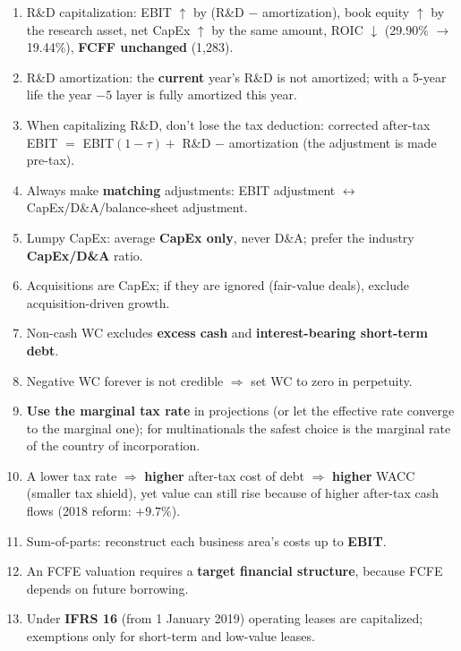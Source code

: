 \begin{trapbox}
\begin{enumerate}[leftmargin=*]
  \item R\&D capitalization: EBIT $\uparrow$ by (R\&D $-$ amortization), book equity $\uparrow$ by the research asset, net CapEx $\uparrow$ by the same amount, ROIC $\downarrow$ (29.90\% $\to$ 19.44\%), \textbf{FCFF unchanged} (1,283).
  \item R\&D amortization: the \textbf{current} year's R\&D is not amortized; with a 5-year life the year $-5$ layer is fully amortized this year.
  \item When capitalizing R\&D, don't lose the tax deduction: corrected after-tax EBIT $=$ EBIT$(1-\tau)+$ R\&D $-$ amortization (the adjustment is made pre-tax).
  \item Always make \textbf{matching} adjustments: EBIT adjustment $\leftrightarrow$ CapEx/D\&A/balance-sheet adjustment.
  \item Lumpy CapEx: average \textbf{CapEx only}, never D\&A; prefer the industry \textbf{CapEx/D\&A} ratio.
  \item Acquisitions are CapEx; if they are ignored (fair-value deals), exclude acquisition-driven growth.
  \item Non-cash WC excludes \textbf{excess cash} and \textbf{interest-bearing short-term debt}.
  \item Negative WC forever is not credible $\Rightarrow$ set WC to zero in perpetuity.
  \item \textbf{Use the marginal tax rate} in projections (or let the effective rate converge to the marginal one); for multinationals the safest choice is the marginal rate of the country of incorporation.
  \item A lower tax rate $\Rightarrow$ \textbf{higher} after-tax cost of debt $\Rightarrow$ \textbf{higher} WACC (smaller tax shield), yet value can still rise because of higher after-tax cash flows (2018 reform: $+9.7\%$).
  \item Sum-of-parts: reconstruct each business area's costs up to \textbf{EBIT}.
  \item An FCFE valuation requires a \textbf{target financial structure}, because FCFE depends on future borrowing.
  \item Under \textbf{IFRS 16} (from 1 January 2019) operating leases are capitalized; exemptions only for short-term and low-value leases.
\end{enumerate}
\end{trapbox}
